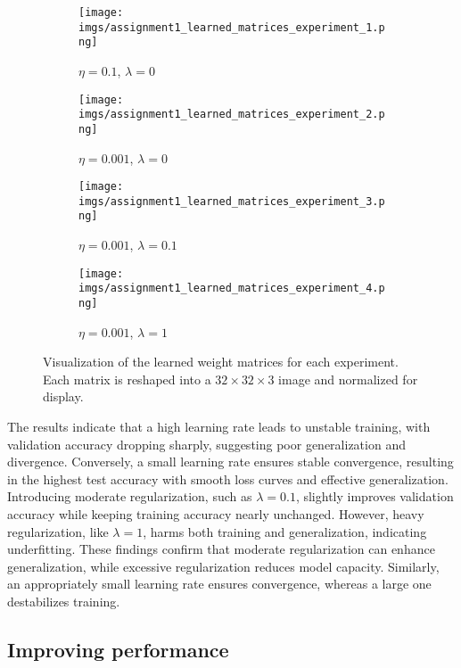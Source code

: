 \documentclass{article}
\begin{document}
\begin{figure}[h!]
    \centering
    \begin{subfigure}{0.45\textwidth}
        \texttt{[image: imgs/assignment1\_learned\_matrices\_experiment\_1.png]}
        \caption{$\eta=0.1$, $\lambda=0$}
        \label{fig:exp_matrix1}
    \end{subfigure}
    \begin{subfigure}{0.45\textwidth}
        \texttt{[image: imgs/assignment1\_learned\_matrices\_experiment\_2.png]}
        \caption{$\eta=0.001$, $\lambda=0$}
        \label{fig:exp_matrix2}
    \end{subfigure}
    \begin{subfigure}{0.45\textwidth}
        \texttt{[image: imgs/assignment1\_learned\_matrices\_experiment\_3.png]}
        \caption{$\eta=0.001$, $\lambda=0.1$}
        \label{fig:exp_matrix3}
    \end{subfigure}
    \begin{subfigure}{0.45\textwidth}
        \texttt{[image: imgs/assignment1\_learned\_matrices\_experiment\_4.png]}
        \caption{$\eta=0.001$, $\lambda=1$}
        \label{fig:exp_matrix4}
    \end{subfigure}
    \caption{Visualization of the learned weight matrices for each experiment. Each matrix is reshaped into a $32 \times 32 \times 3$ image and normalized for display.}
    \label{fig:loss_experiments_matrices}
\end{figure}

The results indicate that a high learning rate leads to unstable training, with validation accuracy dropping sharply, suggesting poor generalization and divergence. Conversely, a small learning rate ensures stable convergence, resulting in the highest test accuracy with smooth loss curves and effective generalization. Introducing moderate regularization, such as $\lambda=0.1$, slightly improves validation accuracy while keeping training accuracy nearly unchanged. However, heavy regularization, like $\lambda=1$, harms both training and generalization, indicating underfitting. These findings confirm that moderate regularization can enhance generalization, while excessive regularization reduces model capacity. Similarly, an appropriately small learning rate ensures convergence, whereas a large one destabilizes training.


\subsection{Improving performance}
\end{document}
